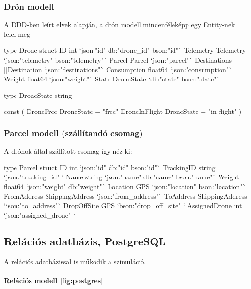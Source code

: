 \subsubsection{Drón modell}
A DDD-ben leírt elvek alapján, a drón modell mindenféleképp egy Entity-nek felel meg.
\begin{python}
    type Drone struct {
        ID           int           `json:"id" db:"drone_id" bson:"id"`
        Telemetry    Telemetry     `json:"telemetry" bson:"telemetry"`
        Parcel       Parcel        `json:"parcel"`
        Destinations []Destination `json:"destinations"`
        Consumption  float64       `json:"consumption"`
        Weight       float64       `json:"weight"`
        State        DroneState    `db:"state" bson:"state"`
    }

    type DroneState string

    const (
    DroneFree     DroneState = "free"
    DroneInFlight DroneState = "in-flight"
    )
\end{python}


\subsubsection{Parcel modell (szállítandó csomag)}
A drónok által szállított csomag így néz ki:
\begin{python}
    type Parcel struct {
        ID            int             `json:"id" db:"id" bson:"id"`
        TrackingID    string          `json:"tracking_id" `
        Name          string          `json:"name" db:"name" bson:"name"`
        Weight        float64         `json:"weight" db:"weight"`
        Location      GPS             `json:"location" bson:"location"`
        FromAddress   ShippingAddress `json:"from_address"`
        ToAddress     ShippingAddress `json:"to_address"`
        DropOffSite   GPS             `bson:"drop_off_site" `
        AssignedDrone int             `json:"assigned_drone" `
    }
\end{python}

\subsection{Relációs adatbázis, PostgreSQL}
A relációs adatbázissal is működik a szimuláció.
\paragraph{Relációs modell \ref{fig:postgres} } \mbox{} \\

